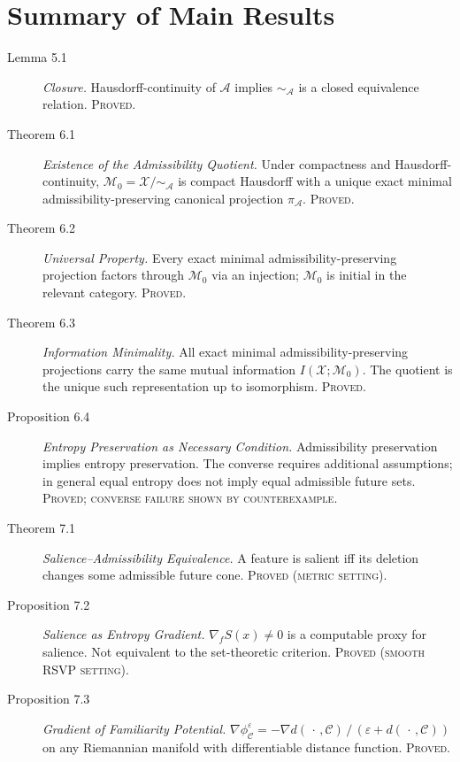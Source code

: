\documentclass[12pt, a4paper, oneside]{book}
\newcommand{\Adm}{\mathcal{A}}
\newcommand{\X}{\mathcal{X}}
\newcommand{\M}{\mathcal{M}}
\newcommand{\C}{\mathcal{C}}
\newcommand{\projA}{\pi_{\!\Adm}}
\newcommand{\SA}{{\sim_{\!\Adm}}}
\newcommand{\Ent}{S}
\newcommand{\phiCe}{\phi_{\C}^{\varepsilon}}
\begin{document}
\chapter{Summary of Main Results}
\label{app:theorems}

\begin{description}
\item[Lemma 5.1] \textit{Closure.} Hausdorff-continuity of $\Adm$ implies
  $\SA$ is a closed equivalence relation. \textsc{Proved.}

\item[Theorem 6.1] \textit{Existence of the Admissibility Quotient.}
  Under compactness and Hausdorff-continuity, $\M_0 = \X/\SA$ is compact
  Hausdorff with a unique exact minimal admissibility-preserving
  canonical projection $\projA$. \textsc{Proved.}

\item[Theorem 6.2] \textit{Universal Property.} Every exact minimal
  admissibility-preserving projection factors through $\M_0$ via an
  injection; $\M_0$ is initial in the relevant category.
  \textsc{Proved.}

\item[Theorem 6.3] \textit{Information Minimality.} All exact minimal
  admissibility-preserving projections carry the same mutual information
  $I(\X;\M_0)$. The quotient is the unique such representation up to
  isomorphism. \textsc{Proved.}

\item[Proposition 6.4] \textit{Entropy Preservation as Necessary Condition.}
  Admissibility preservation implies entropy preservation. The converse
  requires additional assumptions; in general equal entropy does not
  imply equal admissible future sets. \textsc{Proved; converse failure
  shown by counterexample.}

\item[Theorem 7.1] \textit{Salience--Admissibility Equivalence.}
  A feature is salient iff its deletion changes some admissible future
  cone. \textsc{Proved (metric setting).}

\item[Proposition 7.2] \textit{Salience as Entropy Gradient.}
  $\nabla_f \Ent(x) \neq 0$ is a computable proxy for salience.
  Not equivalent to the set-theoretic criterion.
  \textsc{Proved (smooth RSVP setting).}

\item[Proposition 7.3] \textit{Gradient of Familiarity Potential.}
  $\nabla \phiCe = -\nabla d(\,\cdot\,,\C)\,/\,(\varepsilon + d(\,\cdot\,,\C))$
  on any Riemannian manifold with differentiable distance function.
  \textsc{Proved.}


\end{description}
\end{document}
